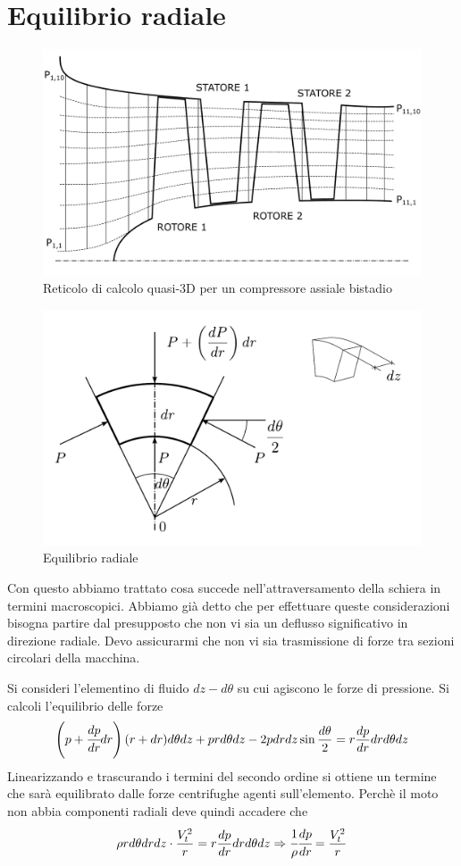 \section{Equilibrio radiale}
\begin{figure}
\centering
  \includegraphics[width=\textwidth]{fig/ReticoloComp.pdf}
\caption{Reticolo di calcolo quasi-3D per un compressore assiale bistadio}
\label{fig:ReticoloComp}
\end{figure}
\begin{figure}
\centering
  \includegraphics[width=.6\textwidth]{fig/concio.pdf}
\caption{Equilibrio radiale}
\label{fig:concio}
\end{figure}
Con questo abbiamo trattato cosa succede nell'attraversamento della schiera in termini macroscopici. Abbiamo già detto che per effettuare queste considerazioni bisogna partire dal presupposto che non vi sia un deflusso significativo in direzione radiale.
Devo assicurarmi che non vi sia trasmissione di forze tra sezioni circolari della macchina.

Si consideri l'elementino di fluido $dz - d\theta$ su cui agiscono le forze di pressione. 
Si calcoli l'equilibrio delle forze
\begin{equation}
\left( p + \cfrac{dp}{dr} dr \right) (r + dr) d \theta dz + pr d \theta dz -2p dr dz \sin \frac{d \theta}{2} = r \frac{dp}{dr} dr d \theta dz
\end{equation}
Linearizzando e trascurando i termini del secondo ordine si ottiene un termine che sarà equilibrato dalle forze centrifughe agenti sull'elemento. Perchè il moto non abbia componenti radiali deve quindi accadere che
\begin{equation}
\rho r d \theta dr dz \cdot \frac{V_t^2}{r} = r \frac{dp}{dr} dr d \theta dz\Rightarrow \cfrac{1}{\rho} \cfrac{dp}{dr} = \frac{V_t^2}{r}
\label{eq:EquilibrioRad}
\end{equation}

